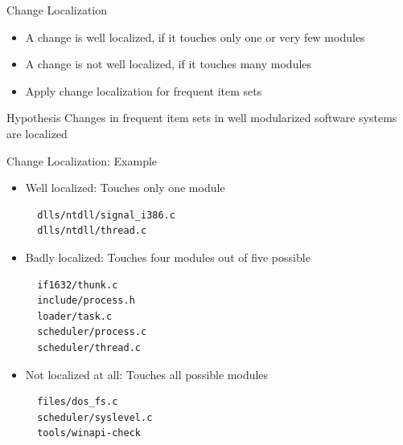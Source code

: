 \note{
}

\begin{frame}{Change Localization}
  \begin{itemize}
  \item A change is well localized, if it touches only one or very few
    modules
  \item A change is not well localized, if it touches many modules
  \item Apply change localization for frequent item sets
  \end{itemize}


  \begin{block}{Hypothesis}
    Changes in frequent item sets in well modularized software systems
    are localized
  \end{block}
\end{frame}


\begin{frame}[containsverbatim]{Change Localization: Example}
  \begin{itemize}
  \item Well localized: Touches only one module
\begin{verbatim}
  dlls/ntdll/signal_i386.c
  dlls/ntdll/thread.c
\end{verbatim}
  \item Badly localized: Touches four modules out of five possible
\begin{verbatim}
  if1632/thunk.c
  include/process.h
  loader/task.c
  scheduler/process.c
  scheduler/thread.c
\end{verbatim}
  \item Not localized at all: Touches all possible modules
\begin{verbatim}
  files/dos_fs.c
  scheduler/syslevel.c
  tools/winapi-check  
\end{verbatim}
  \end{itemize}
\end{frame}

